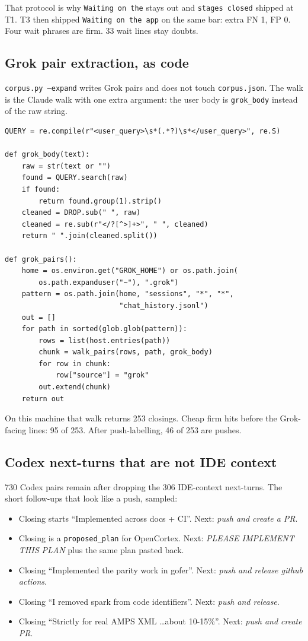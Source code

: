 That protocol is why \texttt{Waiting on the} stays out and
\texttt{stages closed} shipped at T1. T3 then shipped
\texttt{Waiting on the app} on the same bar: extra FN 1, FP 0.
Four wait phrases are firm. 33 wait lines stay doubts.

\subsection{Grok pair extraction, as code}
\label{app:walkpairs}

\texttt{corpus.py --expand} writes Grok pairs and does not touch
\texttt{corpus.json}. The walk is the Claude walk with one extra
argument: the user body is \texttt{grok\_body} instead of the raw
string.

\begin{verbatim}
QUERY = re.compile(r"<user_query>\s*(.*?)\s*</user_query>", re.S)

def grok_body(text):
    raw = str(text or "")
    found = QUERY.search(raw)
    if found:
        return found.group(1).strip()
    cleaned = DROP.sub(" ", raw)
    cleaned = re.sub(r"</?[^>]+>", " ", cleaned)
    return " ".join(cleaned.split())

def grok_pairs():
    home = os.environ.get("GROK_HOME") or os.path.join(
        os.path.expanduser("~"), ".grok")
    pattern = os.path.join(home, "sessions", "*", "*",
                           "chat_history.jsonl")
    out = []
    for path in sorted(glob.glob(pattern)):
        rows = list(host.entries(path))
        chunk = walk_pairs(rows, path, grok_body)
        for row in chunk:
            row["source"] = "grok"
        out.extend(chunk)
    return out
\end{verbatim}

On this machine that walk returns 253 closings. Cheap firm hits
before the Grok-facing lines: 95 of 253. After push-labelling, 46
of 253 are pushes.

\subsection{Codex next-turns that are not IDE context}
\label{app:codexnext}

730 Codex pairs remain after dropping the 306 IDE-context
next-turns. The short follow-ups that look like a push, sampled:

\begin{itemize}
\item Closing starts ``Implemented across docs + CI''. Next:
\emph{push and create a PR}.
\item Closing is a \texttt{proposed\_plan} for OpenCortex. Next:
\emph{PLEASE IMPLEMENT THIS PLAN} plus the same plan pasted back.
\item Closing ``Implemented the parity work in gofer''. Next:
\emph{push and release github actions}.
\item Closing ``I removed spark from code identifiers''. Next:
\emph{push and release}.
\item Closing ``Strictly for real AMPS XML \ldots about 10-15\%''.
Next: \emph{push and create PR}.
\end{itemize}

